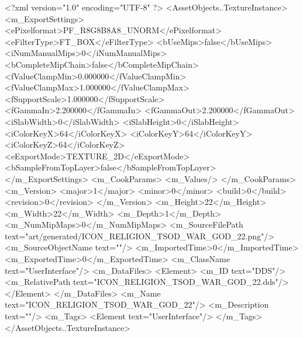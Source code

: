 <?xml version="1.0" encoding="UTF-8" ?>
<AssetObjects..TextureInstance>
	<m_ExportSettings>
		<ePixelformat>PF_R8G8B8A8_UNORM</ePixelformat>
		<eFilterType>FT_BOX</eFilterType>
		<bUseMips>false</bUseMips>
		<iNumManualMips>0</iNumManualMips>
		<bCompleteMipChain>false</bCompleteMipChain>
		<fValueClampMin>0.000000</fValueClampMin>
		<fValueClampMax>1.000000</fValueClampMax>
		<fSupportScale>1.000000</fSupportScale>
		<fGammaIn>2.200000</fGammaIn>
		<fGammaOut>2.200000</fGammaOut>
		<iSlabWidth>0</iSlabWidth>
		<iSlabHeight>0</iSlabHeight>
		<iColorKeyX>64</iColorKeyX>
		<iColorKeyY>64</iColorKeyY>
		<iColorKeyZ>64</iColorKeyZ>
		<eExportMode>TEXTURE_2D</eExportMode>
		<bSampleFromTopLayer>false</bSampleFromTopLayer>
	</m_ExportSettings>
	<m_CookParams>
		<m_Values/>
	</m_CookParams>
	<m_Version>
		<major>1</major>
		<minor>0</minor>
		<build>0</build>
		<revision>0</revision>
	</m_Version>
	<m_Height>22</m_Height>
	<m_Width>22</m_Width>
	<m_Depth>1</m_Depth>
	<m_NumMipMaps>0</m_NumMipMaps>
	<m_SourceFilePath text="art/generated/ICON_RELIGION_TSOD_WAR_GOD_22.png"/>
	<m_SourceObjectName text=""/>
	<m_ImportedTime>0</m_ImportedTime>
	<m_ExportedTime>0</m_ExportedTime>
	<m_ClassName text="UserInterface"/>
	<m_DataFiles>
		<Element>
			<m_ID text="DDS"/>
			<m_RelativePath text="ICON_RELIGION_TSOD_WAR_GOD_22.dds"/>
		</Element>
	</m_DataFiles>
	<m_Name text="ICON_RELIGION_TSOD_WAR_GOD_22"/>
	<m_Description text=""/>
	<m_Tags>
		<Element text="UserInterface"/>
	</m_Tags>
</AssetObjects..TextureInstance>

